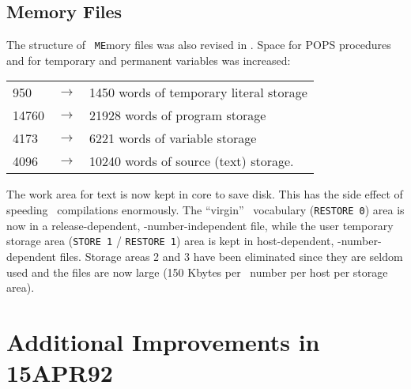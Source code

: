 \subsection{Memory Files}

The structure of \AIPS\ {\tt ME}mory files was also revised in
\RELEASENAME.  Space for POPS procedures and for temporary and
permanent variables was increased:
\vspace{\MYSpace}
\begin{center}
\begin{tabular}{lll}
     950 & $\rightarrow$ & 1450 words of temporary literal storage \\
   14760 & $\rightarrow$ &21928 words of program storage \\
    4173 & $\rightarrow$ & 6221 words of variable storage \\
    4096 & $\rightarrow$ &10240 words of source (text) storage. \\
\end{tabular}
\end{center}
\vspace{\MYSpace}
The work area for text is now kept in core to save disk.  This has the
side effect of speeding \POPS\ compilations enormously.  The
``virgin'' \POPS\ vocabulary ({\tt RESTORE 0}) area is now in a
release-dependent, \POPS-number-independent file, while the user
temporary storage area ({\tt STORE 1} / {\tt RESTORE 1}) area is kept
in host-dependent, \POPS-number-dependent files.  Storage areas 2 and
3 have been eliminated since they are seldom used and the files are
now large (150 Kbytes per \POPS\ number per host per storage area).
\eject

\section{Additional Improvements in 15APR92}

